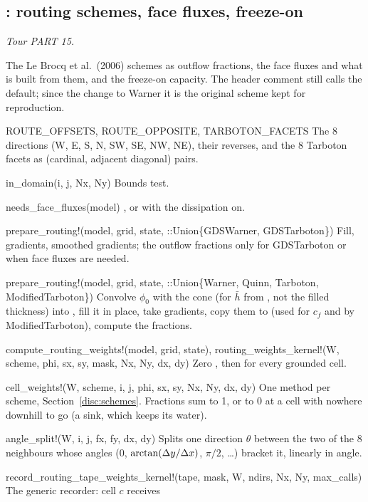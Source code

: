 \subsection{: routing schemes, face fluxes, freeze-on}\label{ref:routing}
\emph{Tour PART 15.}

The Le Brocq et al.\ (2006) schemes as outflow fractions, the face fluxes and what is built from them, and the freeze-on
capacity. The header comment still calls  the default; since the change to Warner it is the original
scheme kept for reproduction.
\begin{fnlist}
\item[ROUTE\_OFFSETS, ROUTE\_OPPOSITE, TARBOTON\_FACETS] The 8 directions (W, E, S, N, SW, SE, NW, NE), their reverses, and the 8
  Tarboton facets as (cardinal, adjacent diagonal) pairs.
\item[in\_domain(i, j, Nx, Ny)] Bounds test.
\item[needs\_face\_fluxes(model)] , or  with the dissipation on.
\item[prepare\_routing!(model, grid, state, ::Union\{GDSWarner, GDSTarboton\})] Fill, gradients, smoothed gradients; the outflow
  fractions only for GDSTarboton or when face fluxes are needed.
\item[prepare\_routing!(model, grid, state, ::Union\{Warner, Quinn, Tarboton, ModifiedTarboton\})] Convolve $\phi_0$ with the cone (for
  $\bar h$ from , not the filled thickness) into , fill it in place, take gradients, copy them to
   (used for $c_f$ and by ModifiedTarboton), compute the fractions.
\item[compute\_routing\_weights!(model, grid, state), routing\_weights\_kernel!(W, scheme, phi, sx, sy, mask, Nx, Ny, dx, dy)] Zero
  , then  for every grounded cell.
\item[cell\_weights!(W, scheme, i, j, phi, sx, sy, Nx, Ny, dx, dy)] One method per scheme, Section~\ref{disc:schemes}. Fractions sum to
  1, or to 0 at a cell with nowhere downhill to go (a sink, which keeps its water).
\item[angle\_split!(W, i, j, fx, fy, dx, dy)] Splits one direction $\theta$ between the two of the 8 neighbours whose angles
  ($0$, $\arctan(\Delta y/\Delta x)$, $\pi/2$, \ldots) bracket it, linearly in angle.
\item[record\_routing\_tape\_weights\_kernel!(tape, mask, W, ndirs, Nx, Ny, max\_calls)] The generic recorder: cell $c$ receives

\end{fnlist}
